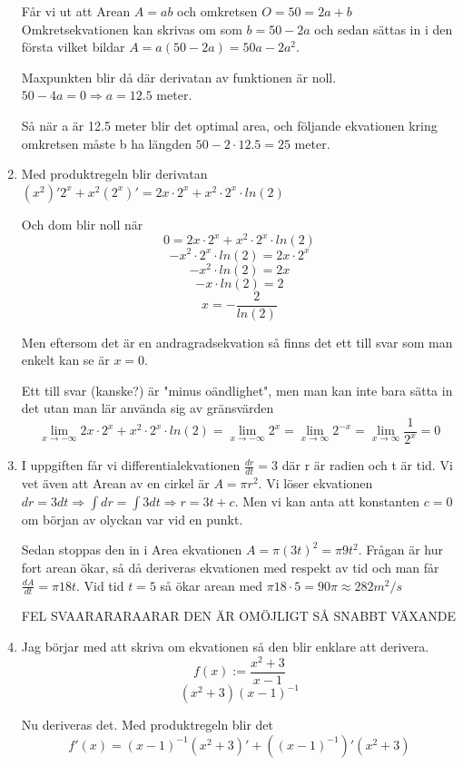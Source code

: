\documentclass[a4paper,12pt]{article}
\begin{document}
\begin{enumerate}
    Får vi ut att Arean $A=ab$ och omkretsen $O=50=2a+b$
    Omkretsekvationen kan skrivas om som $b=50-2a$ och sedan 
    sättas in i den första vilket bildar $A=a(50-2a)=50a-2a^2$.

    Maxpunkten blir då där derivatan av funktionen är noll.
    $50-4a=0\Rightarrow a=12.5$ meter.

    Så när a är 12.5 meter blir det optimal area, och följande 
    ekvationen kring omkretsen måste b ha längden $50-2\cdot 12.5=25$ meter.

    \item 
    Med produktregeln blir derivatan
    $(x^2)'2^x+x^2(2^x)'=2x\cdot 2^x + x^2\cdot 2^x\cdot ln(2)$

    Och dom blir noll när 
    $$0=2x\cdot 2^x + x^2\cdot 2^x\cdot ln(2)$$
    $$-x^2\cdot 2^x\cdot ln(2)=2x\cdot 2^x $$
    $$-x^2\cdot ln(2)=2x$$
    $$-x\cdot ln(2)=2$$
    $$x=-\frac{2}{ln(2)}$$
    
    Men eftersom det är en andragradsekvation så finns det ett till 
    svar som man enkelt kan se är $x=0$.
    
    Ett till svar (kanske?) är "minus oändlighet", men man kan inte bara sätta
    in det utan man lär använda sig av gränsvärden
    $$\lim_{x\rightarrow -\infty}2x\cdot 2^x + x^2\cdot 2^x\cdot ln(2)
    =\lim_{x\rightarrow -\infty}2^{x}
    =\lim_{x\rightarrow \infty}2^{-x}
    =\lim_{x\rightarrow \infty}\frac{1}{2^x}
    =0$$

    \item I uppgiften får vi differentialekvationen $\frac{dr}{dt}=3$ 
    där r är radien och t är tid. Vi vet även att Arean av en cirkel är 
    $A=\pi r^2$. Vi löser ekvationen 
    $dr=3dt\Rightarrow \int dr =\int 3dt
    \Rightarrow r=3t+c$.
    Men vi kan anta att konstanten $c=0$ om början av olyckan var vid en punkt.
    
    Sedan stoppas den in i Area ekvationen $A=\pi (3t)^2=\pi 9t^2$. 
    Frågan är hur fort arean ökar, så då deriveras ekvationen med respekt av tid
    och man får $\frac{dA}{dt}=\pi 18t$. Vid tid $t=5$ så ökar arean med $\pi 18\cdot 5=90\pi \approx 282 m^2/s$
    
    FEL SVAARARARAARAR DEN ÄR OMÖJLIGT SÅ SNABBT VÄXANDE

    \item 
    Jag börjar med att skriva om ekvationen så den 
    blir enklare att derivera.
    $$f(x):=\frac{x^2+3}{x-1}$$
    $$(x^2+3)(x-1)^{-1}$$
    
    Nu deriveras det. Med produktregeln blir det 
    $$f'(x)=(x-1)^{-1}(x^2+3)'+((x-1)^{-1})'(x^2+3)$$
    

\end{enumerate}
\end{document}
